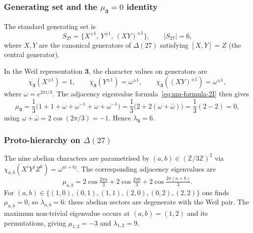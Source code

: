 \documentclass[11pt,a4paper]{article}
\begin{document}
    \subsubsection{Generating set and the $\mu_{\mathbf{3}} = 0$ identity}

    The standard generating set is
    \begin{equation}
      S_{27} = \{X^{\pm 1},\, Y^{\pm 1},\, (XY)^{\pm 1}\},
      \qquad
      |S_{27}| = 6,
      \label{eq:S27}
    \end{equation}
    where $X, Y$ are the canonical generators of $\Delta(27)$ satisfying
    $[X,Y] = Z$ (the central generator).

    In the Weil representation $\mathbf{3}$, the character values on generators are
    \begin{equation}
      \chi_{\mathbf{3}}(X^{\pm 1}) = 1,
      \qquad
      \chi_{\mathbf{3}}(Y^{\pm 1}) = \omega^{\pm 1},
      \qquad
      \chi_{\mathbf{3}}((XY)^{\pm 1}) = \omega^{\pm 1},
      \label{eq:delta27-chars}
    \end{equation}
    where $\omega = e^{2\pi i/3}$.
    The adjacency eigenvalue formula~\eqref{eq:mu-formula-2I} then gives
    \begin{equation}
      \mu_{\mathbf{3}}
      = \frac{1}{3}\bigl(1 + 1 + \omega + \omega^{-1} + \omega + \omega^{-1}\bigr)
      = \frac{1}{3}\bigl(2 + 2(\omega + \bar\omega)\bigr)
      = \frac{1}{3}(2 - 2) = 0,
      \label{eq:delta27-mu0}
    \end{equation}
    using $\omega + \bar\omega = 2\cos(2\pi/3) = -1$.
    Hence $\lambda_{\mathbf{3}} = 6$.

    \subsubsection{Proto-hierarchy on $\Delta(27)$}

    The nine abelian characters are parametrised by $(a,b) \in (\mathbb{Z}/3\mathbb{Z})^2$
    via $\chi_{a,b}(X^i Y^j Z^k) = \omega^{ai+bj}$.
    The corresponding adjacency eigenvalues are
    \begin{equation}
      \mu_{a,b}
      = 2\cos\!\tfrac{2\pi a}{3} + 2\cos\!\tfrac{2\pi b}{3}
      + 2\cos\!\tfrac{2\pi(a+b)}{3}.
      \label{eq:delta27-abelian-mu}
    \end{equation}
    For $(a,b) \in \{(1,0),(0,1),(1,1),(2,0),(0,2),(2,2)\}$ one finds $\mu_{a,b} = 0$,
    so $\lambda_{a,b} = 6$: these abelian sectors are degenerate with the Weil pair.
    The maximum non-trivial eigenvalue occurs at $(a,b)=(1,2)$ and its permutations, giving
    $\mu_{1,2} = -3$ and $\lambda_{1,2} = 9$.
\end{document}
